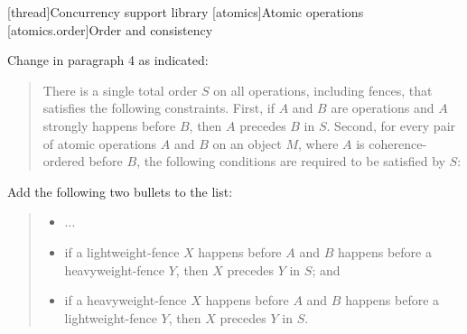 

\setcounter{chapter}{32}
[thread]{Concurrency support library}
\setcounter{section}{4}
[atomics]{Atomic operations}
\setcounter{subsection}{3}
[atomics.order]{Order and consistency}

Change in  paragraph 4 as indicated:
\begin{quote}
\setcounter{Paras}{3}
\pnum
There is a single total order $S$
on all  operations, including fences,
that satisfies the following constraints.
First, if $A$ and $B$ are
 operations and
$A$ strongly happens before $B$,
then $A$ precedes $B$ in $S$.
Second, for every pair of atomic operations $A$ and
$B$ on an object $M$,
where $A$ is coherence-ordered before $B$,
the following  conditions are required to be satisfied by $S$:

\end{quote}

Add the following two bullets to the list:
\begin{quote}
\pnum
\begin{itemize}
\item
  ...
\item
if a  lightweight-fence $X$ happens before $A$ and $B$ happens
before a  heavyweight-fence $Y$, then $X$ precedes $Y$ in $S$; and
\item  if a  heavyweight-fence $X$ happens before $A$ and $B$ happens
before a  lightweight-fence $Y$, then $X$ precedes $Y$ in $S$.
\end{itemize}
\end{quote}